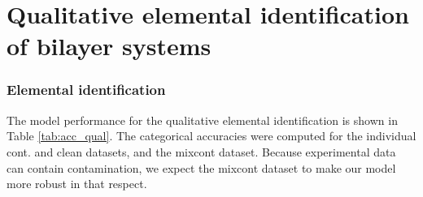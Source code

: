 \section{Qualitative elemental identification of bilayer systems}
\subsubsection{Elemental identification}
The model performance for the qualitative elemental identification is shown in Table \ref{tab:acc_qual}. The categorical accuracies were computed for the individual cont. and clean datasets, and the mixcont dataset. Because experimental data can contain contamination, we expect the mixcont dataset to make our model more robust in that respect.

